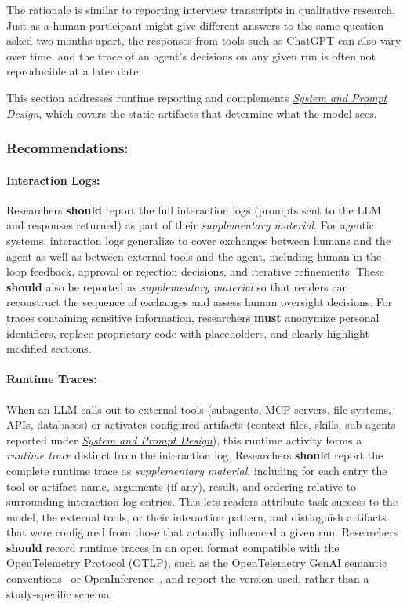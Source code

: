 \documentclass[smallextended]{svjour3}
\newcommand{\must}{\textbf{must}\xspace}
\newcommand{\should}{\textbf{should}\xspace}
\newcommand{\supplementarymaterial}{\emph{supplementary material}\xspace}
\newcommand{\supplementarymaterial}{\emph{supplementary material}\xspace}
\newcommand{\design}{\hyperref[sec:report-system-and-prompt-design]{\emph{System and Prompt Design}}\xspace}
\newcommand{\design}{\href{/guidelines\#report-system-and-prompt-design}{\emph{System and Prompt Design}}\xspace}
\newcommand{\guidelinesubsubsection}[1]{\subsubsection{\bfseries #1:}}
\newcommand{\guidelinesubsubsection}[1]{\subsubsection{#1}}
\begin{document}
The rationale is similar to reporting interview transcripts in qualitative research.
Just as a human participant might give different answers to the same question asked two months apart, the responses from tools such as ChatGPT can also vary over time, and the trace of an agent's decisions on any given run is often not reproducible at a later date.

This section addresses runtime reporting and complements \design, which covers the static artifacts that determine what the model sees.

\guidelinesubsubsection{Recommendations}

\paragraph{Interaction Logs:}
Researchers \should report the full interaction logs (prompts sent to the LLM and responses returned) as part of their \supplementarymaterial.
For agentic systems, interaction logs generalize to cover exchanges between humans and the agent as well as between external tools and the agent, including human-in-the-loop feedback, approval or rejection decisions, and iterative refinements.
These \should also be reported as \supplementarymaterial so that readers can reconstruct the sequence of exchanges and assess human oversight decisions.
For traces containing sensitive information, researchers \must anonymize personal identifiers, replace proprietary code with placeholders, and clearly highlight modified sections.

\paragraph{Runtime Traces:}
When an LLM calls out to external tools (subagents, MCP servers, file systems, APIs, databases) or activates configured artifacts (context files, skills, sub-agents reported under \design), this runtime activity forms a \emph{runtime trace} distinct from the interaction log.
Researchers \should report the complete runtime trace as \supplementarymaterial, including for each entry the tool or artifact name, arguments (if any), result, and ordering relative to surrounding interaction-log entries.
This lets readers attribute task success to the model, the external tools, or their interaction pattern, and distinguish artifacts that were configured from those that actually influenced a given run.
Researchers \should record runtime traces in an open format compatible with the OpenTelemetry Protocol (OTLP), such as the OpenTelemetry GenAI semantic conventions~\cite{otel_genai_semconv} or OpenInference~\cite{openinference_spec}, and report the version used, rather than a study-specific schema.
\end{document}
